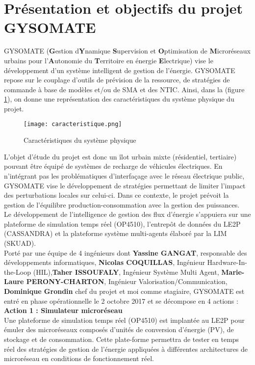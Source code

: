 \section*{Présentation et objectifs du projet GYSOMATE}
GYSOMATE (\textbf{G}estion d\textbf{Y}namique \textbf{S}upervision et \textbf{O}ptimisation de \textbf{M}icroréseaux urbains pour l’\textbf{A}utonomie du \textbf{T}erritoire en énergie \textbf{E}lectrique) vise le développement d’un système intelligent de gestion de l’énergie. GYSOMATE repose sur le couplage d’outils de prévision de la ressource, de stratégies de commande à base de modèles et/ou de SMA et des NTIC. Ainsi, dans la (figure \ref{1.1}), on donne une représentation des caractéristiques du système physique du projet.\\
\begin{figure}[ht]
    \centering
    \texttt{[image: caracteristique.png]}
    \caption{Caractéristiques du système physique}
    \label{1.1}
\end{figure}
L’objet d’étude du projet est donc un îlot urbain mixte (résidentiel, tertiaire) pouvant être équipé de systèmes de recharge de véhicules électriques.
En n'intégrant pas les problématiques d'interfaçage avec le réseau électrique public, GYSOMATE vise le développement de stratégies permettant de limiter l'impact des perturbations locales sur celui-ci. Dans ce contexte, le projet prévoit la gestion de l'équilibre production-consommation avec la gestion des puissances.
\\
Le développement de l’intelligence de gestion des flux d’énergie s’appuiera sur une plateforme de simulation temps réel (OP4510), l’entrepôt de données du LE2P (CASSANDRA) et la plateforme système multi-agents élaboré par la LIM (SKUAD).\\ Porté par une équipe de 4 ingénieurs dont \textbf{Yassine GANGAT}, responsable des développements informatiques, \textbf{Nicolas COQUILLAS}, Ingénieur Hardware-In-the-Loop (HIL),\textbf{Taher ISSOUFALY}, Ingénieur Système Multi Agent, \textbf{Marie-Laure PERONY-CHARTON}, Ingénieur Valorisation/Communication, \textbf{Dominique Grondin} chef du projet et moi comme stagiaire, GYSOMATE est entré en phase opérationnelle le 2 octobre 2017 et se décompose en 4 actions
 :\\
\textbf{Action 1 : Simulateur microréseau}\\
Une plateforme de simulation temps réel (OP4510) est implantée au LE2P pour émuler des microréseaux composés d’unités de conversion d’énergie (PV), de stockage et de consommation. Cette plate-forme permettra de tester en temps réel des stratégies de gestion de l’énergie appliquées à différentes architectures de microréseau en conditions de fonctionnement réel.\\
